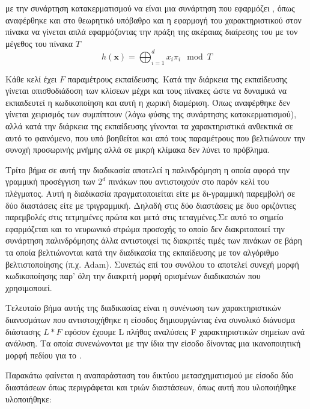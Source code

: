     με την συνάρτηση κατακερματισμού να είναι μια συνάρτηση που εφαρμόζει , όπως αναφέρθηκε και στο θεωρητικό υπόβαθρο και η εφαρμογή του  χαρακτηριστικού στον πίνακα να γίνεται απλά εφαρμόζοντας την πράξη της ακέραιας διαίρεσης του  με τον μέγεθος του  πίνακα $T$
    \begin{equation}
        h(\mathbf{x})=\bigoplus_{i=1}^d x_i \pi_i  \mod T
        \label{hashfunction}
    \end{equation}

    Κάθε κελί έχει $F$ παραμέτρους εκπαίδευσης.
    Κατά την διάρκεια της εκπαίδευσης γίνεται οπισθοδιάδοση των κλίσεων μέχρι και τους πίνακες  ώστε να δυναμικά να εκπαιδευτεί η κωδικοποίηση και αυτή η χωρική διαμέριση. Όπως αναφέρθηκε δεν γίνεται χειρισμός των  συμπίπτουν (λόγω φύσης της συνάρτησης κατακερματισμού), αλλά κατά την διάρκεια της εκπαίδευσης γίνονται τα χαρακτηριστικά  ανθεκτικά σε αυτό το φαινόμενο, που υπό βοηθείται και από τους παραμέτρους  που βελτιώνουν την συνοχή προσωρινής μνήμης αλλά σε μικρή κλίμακα δεν λύνει το πρόβλημα. 
\par
    Τρίτο βήμα σε αυτή την διαδικασία αποτελεί η παλινδρόμηση η οποία αφορά την γραμμική προσέγγιση των $2^d$ πινάκων  που αντιστοιχούν στο παρόν κελί του πλέγματος. Αυτή η διαδικασία πραγματοποιείται είτε με δι-γραμμική παρεμβολή σε δύο διαστάσεις είτε με τριγραμμική. Δηλαδή στις δύο διαστάσεις με δυο οριζόντιες παρεμβολές στις τετμημένες πρώτα και μετά στις τεταγμένες.Σε αυτό το σημείο εφαρμόζεται και το νευρωνικό στρώμα προσοχής το οποίο δεν διακριτοποιεί την συνάρτηση παλινδρόμησης άλλα αντιστοιχεί τις διακριτές τιμές των πινάκων σε βάρη τα οποία βελτιώνονται κατά την διαδικασία της εκπαίδευσης με τον αλγόριθμο βελτιστοποίησης (π.χ. Adam). Συνεπώς επί του συνόλου το  αποτελεί συνεχή μορφή κωδικοποίησης παρ' όλη την διακριτή μορφή ορισμένων διαδικασιών που χρησιμοποιεί.

\par
    Τελευταίο βήμα αυτής της διαδικασίας είναι η συνένωση των χαρακτηριστικών διανυσμάτων που αντιστοιχήθηκε η είσοδος δημιουργώντας ένα συνολικό διάνυσμα διάστασης $L*F$ εφόσον έχουμε L πλήθος αναλύσεις F χαρακτηριστικών σημείων ανά ανάλυση. Τα οποία συνενώνονται με την ίδια την είσοδο δίνοντας μια ικανοποιητική μορφή πεδίου για το .
    
    Παρακάτω φαίνεται η αναπαράσταση του δικτύου μετασχηματισμού με είσοδο δύο διαστάσεων όπως περιγράφεται και τριών διαστάσεων, όπως αυτή που υλοποιήθηκε υλοποιήθηκε:


